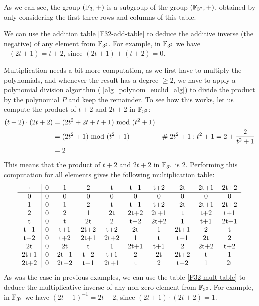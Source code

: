 \begin{example}
As we can see, the group $(\mathbb{F}_3,+)$ is a subgroup of the group $(\mathbb{F}_{3^2},+)$, obtained by only considering the first three rows and columns of this table.

We can use the addition table \eqref{F32-add-table} to deduce the additive inverse (the negative) of any element from $\mathbb{F}_{3^2}$. For example, in $\mathbb{F}_{3^2}$ we have $-(2t+1)= t+2$, since $(2t+1) + (t+2)=0$.

Multiplication needs a bit more computation, as we first have to multiply the polynomials, and whenever the result has a degree $\geq 2$, we have to apply a polynomial division algorithm  (\algname{} \ref{alg_polynom_euclid_alg}) to divide the product by the polynomial $P$ and keep the remainder. To see how this works, let us compute the product of $t+2$ and $2t+2$ in $\mathbb{F}_{3^2}$:
\begin{align*}
(t+2) \cdot (2t+2) &= (2t^2 + 2t + t + 1) \text{ mod } (t^2+1) \\
                   &= (2t^2+1) \text{ mod } (t^2+1) & \#\; 2t^2+1:t^2+1= 2 + \frac{2}{t^2+1} \\
                   &= 2
\end{align*}
This means that the product of $t+2$ and $2t+2$ in $\mathbb{F}_{3^2}$ is $2$. Performing this computation for all elements gives the following multiplication table:
\begin{equation}\label{F32-mult-table}
  \begin{tabular}{c | c c c c c c c c c}
$\cdot$ & 0    & 1    & 2    & t    & t+1  & t+2  & 2t   & 2t+1 & 2t+2 \\\hline
      0 & 0    & 0    & 0    & 0    & 0    & 0    & 0    & 0    & 0 \\
      1 & 0    & 1    & 2    & t    & t+1  & t+2  & 2t   & 2t+1 & 2t+2\\
      2 & 0    & 2    & 1    & 2t   & 2t+2 & 2t+1 & t    & t+2  & t+1 \\
      t & 0    & t    & 2t   & 2    & t+2  & 2t+2 & 1    & t+1  & 2t+1  \\
    t+1 & 0    & t+1  & 2t+2 & t+2  & 2t   & 1    & 2t+1 & 2    & t   \\
    t+2 & 0    & t+2  & 2t+1 & 2t+2 & 1    & t    & t+1  & 2t   & 2    \\
     2t & 0    & 2t   & t    & 1    & 2t+1 & t+1  & 2  & 2t+2 & t+2\\
   2t+1 & 0    & 2t+1 & t+2  & t+1  & 2    & 2t   & 2t+2 & t    & 1    \\
   2t+2 & 0    & 2t+2 & t+1  & 2t+1 & t    & 2    & t+2  & 1     & 2t
  \end{tabular}
\end{equation}
As was the case in previous examples, we can use the table \eqref{F32-mult-table} to deduce the multiplicative inverse of any non-zero element from $\mathbb{F}_{3^2}$. For example, in $\mathbb{F}_{3^2}$ we have $(2t+1)^{-1}= 2t+2 $, since $(2t+1) \cdot (2t+2)=1$.


\end{example}
